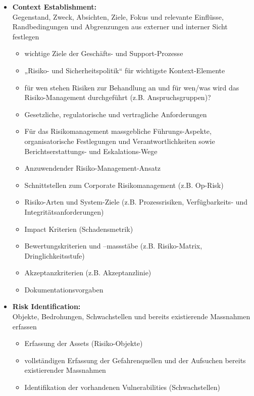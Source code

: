 \documentclass[10pt,a4paper]{article}
\begin{document}
\begin{itemize}[noitemsep,topsep=0pt,leftmargin=*]
    \item \textbf{Context Establishment:}\\Gegenstand, Zweck, Absichten,
    Ziele, Fokus und relevante Einflüsse, Randbedingungen und
    Abgrenzungen aus externer und interner Sicht festlegen
    \begin{itemize}[noitemsep,topsep=0pt,leftmargin=*]
        \item wichtige Ziele der Geschäfts- und Support-Prozesse
        \item „Risiko- und Sicherheitspolitik“ für wichtigste Kontext-Elemente
        \item für wen stehen Risiken zur Behandlung an und für wen/was wird das Risiko-Management durchgeführt (z.B. Anspruchsgruppen)?
        \item Gesetzliche, regulatorische und vertragliche Anforderungen
        \item Für das Risikomanagement massgebliche Führungs-Aspekte, organisatorische Festlegungen und Verantwortlichkeiten sowie Berichtserstattungs- und Eskalations-Wege
        \item Anzuwendender Risiko-Management-Ansatz
        \item Schnittstellen zum Corporate Risikomanagement (z.B. Op-Risk)
        \item Risiko-Arten und System-Ziele (z.B. Prozessrisiken, Verfügbarkeits- und Integritätsanforderungen)
        \item Impact Kriterien (Schadensmetrik)
        \item Bewertungskriterien und –massstäbe (z.B. Risiko-Matrix, Dringlichkeitsstufe)
        \item Akzeptanzkriterien (z.B. Akzeptanzlinie)
        \item Dokumentationsvorgaben
    \end{itemize}
    \item \textbf{Risk Identification:}\\Objekte, Bedrohungen,
    Schwachstellen und bereits existierende Massnahmen
    erfassen
    \begin{itemize}[noitemsep,topsep=0pt,leftmargin=*]
        \item Erfassung der Assets (Risiko-Objekte)
        \item vollständigen Erfassung der Gefahrenquellen und der Aufsuchen bereits existierender Massnahmen
        \item Identifikation der vorhandenen Vulnerabilities (Schwachstellen)

\end{itemize}
\end{itemize}
\end{document}
